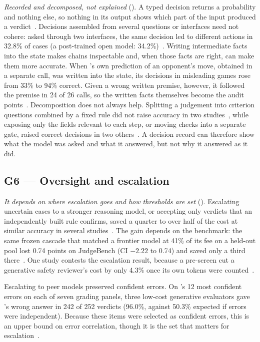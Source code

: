 \emph{Recorded and decomposed, not explained} (\nTallyFive{}).
A typed decision returns a probability and nothing else, so nothing in its output shows which part of the input produced a verdict~\cite{willison2026jev}.
Decisions assembled from several questions or interfaces need not cohere: asked through two interfaces, the same decision led to different actions in 32.8\% of cases (a post-trained open model: 34.2\%)~\cite{arx37470}.
Writing intermediate facts into the state makes chains inspectable and, when those facts are right, can make them more accurate.
When \jev{}'s own prediction of an opponent's move, obtained in a separate call, was written into the state, its decisions in misleading games rose from 33\% to 94\% correct. Given a wrong written premise, however, it followed the premise in 24 of 26 calls, so the written facts themselves become the audit points~\cite{arx01834}.
Decomposition does not always help.
Splitting a judgement into criterion questions combined by a fixed rule did not raise accuracy in two studies~\cite{arx03324,arx08829}, while exposing only the fields relevant to each step, or moving checks into a separate gate, raised correct decisions in two others~\cite{arx07327,arx06425}.
A decision record can therefore show what the model was asked and what it answered, but not why it answered as it did.

\subsection{G6 --- Oversight and escalation}
\label{sec:g6}

\emph{It depends on where escalation goes and how thresholds are set} (\nTallySix{}).
Escalating uncertain cases to a stronger reasoning model, or accepting only verdicts that an independently built rule confirms, saved a quarter to over half of the cost at similar accuracy in several studies~\cite{arx26550,arx24574,arx02048}.
The gain depends on the benchmark: the same frozen cascade that matched a frontier model at 41\% of its fee on a held-out pool lost 0.74 points on JudgeBench (CI $-2.22$ to 0.74) and saved only a third there~\cite{arx26550}.
One study contests the escalation result, because a \jev{} pre-screen cut a generative safety reviewer's cost by only 4.3\% once its own tokens were counted~\cite{arx02267}.

Escalating to peer models preserved confident errors.
On \jev{}'s 12 most confident errors on each of seven grading panels, three low-cost generative evaluators gave \jev{}'s wrong answer in 242 of 252 verdicts (96.0\%, against 50.3\% expected if errors were independent).
Because these items were selected as confident errors, this is an upper bound on error correlation, though it is the set that matters for escalation~\cite{arx29769}.

